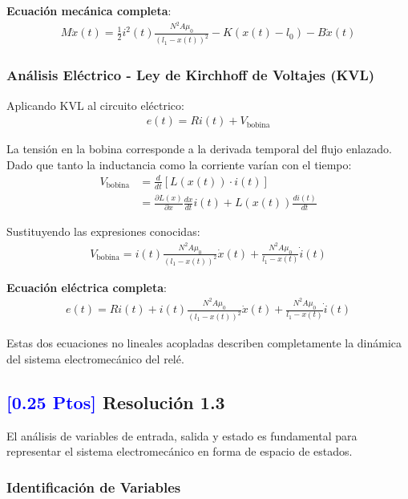 \documentclass[
  11pt,
  letterpaper,
   addpoints,
   answers
  ]{exam}
\begin{document}
\begin{solution}
    \textbf{Ecuación mecánica completa}:
    \begin{align}
        \boxed{M \ddot{x}(t) = \frac{1}{2} i^2(t) \frac{N^2 A \mu_0}{(l_1 - x(t))^2} - K(x(t) - l_0) - B \dot{x}(t)}
    \end{align}

    \subsubsection*{Análisis Eléctrico - Ley de Kirchhoff de Voltajes (KVL)}
    
    Aplicando KVL al circuito eléctrico:
    \begin{align}
        e(t) = R i(t) + V_{\text{bobina}}
    \end{align}

    La tensión en la bobina corresponde a la derivada temporal del flujo enlazado. Dado que tanto la inductancia como la corriente varían con el tiempo:
    \begin{align}
        V_{\text{bobina}} &= \frac{d}{dt}[L(x(t)) \cdot i(t)]\\
        &= \frac{\partial L(x)}{\partial x} \frac{dx}{dt} i(t) + L(x(t)) \frac{di(t)}{dt}
    \end{align}

    Sustituyendo las expresiones conocidas:
    \begin{align}
        V_{\text{bobina}} = i(t) \frac{N^2 A \mu_0}{(l_1 - x(t))^2} \dot{x}(t) + \frac{N^2 A \mu_0}{l_1 - x(t)} \dot{i}(t)
    \end{align}

    \textbf{Ecuación eléctrica completa}:
    \begin{align}
        \boxed{e(t) = R i(t) + i(t) \frac{N^2 A \mu_0}{(l_1 - x(t))^2} \dot{x}(t) + \frac{N^2 A \mu_0}{l_1 - x(t)} \dot{i}(t)}
    \end{align}

    Estas dos ecuaciones no lineales acopladas describen completamente la dinámica del sistema electromecánico del relé.
\subsection*{\textcolor{blue}{[0.25 Ptos]} Resolución 1.3}

El análisis de variables de entrada, salida y estado es fundamental para representar el sistema electromecánico en forma de espacio de estados.

\subsubsection*{Identificación de Variables}


\end{solution}
\end{document}
